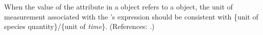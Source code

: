 When the value of the attribute  in a \RateRule object
refers to a \Species object, the unit of measurement associated with the
\RateRule's  expression should be consistent with \{unit of
species quantity\}/\{unit of \emph{time}\}.  (References: .)
